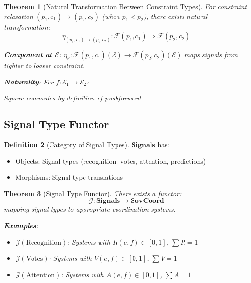 \documentclass[11pt,a4paper]{article}
\newtheorem{theorem}{Theorem}[section]
\theoremstyle{definition}
\newtheorem{definition}[theorem]{Definition}
\theoremstyle{remark}
\newcommand{\E}{\mathcal{E}}
\newcommand{\SovCoord}{\mathbf{SovCoord}}
\begin{document}
\begin{theorem}[Natural Transformation Between Constraint Types]
For constraint relaxation $(p_1, c_1) \to (p_2, c_2)$ (when $p_1 < p_2$), there exists natural transformation:
\[ \eta_{(p_1,c_1) \to (p_2,c_2)}: \mathcal{F}(p_1,c_1) \Rightarrow \mathcal{F}(p_2,c_2) \]

\textbf{Component at $\E$}: $\eta_\E: \mathcal{F}(p_1,c_1)(\E) \to \mathcal{F}(p_2,c_2)(\E)$ maps signals from tighter to looser constraint.

\textbf{Naturality}: For $f: \E_1 \to \E_2$:
\begin{center}
\end{center}

Square commutes by definition of pushforward.
\end{theorem}

\subsection{Signal Type Functor}

\begin{definition}[Category of Signal Types]
$\mathbf{Signals}$ has:
\begin{itemize}
\item Objects: Signal types (recognition, votes, attention, predictions)
\item Morphisms: Signal type translations
\end{itemize}
\end{definition}

\begin{theorem}[Signal Type Functor]
There exists a functor:
\[ \mathcal{G}: \mathbf{Signals} \to \SovCoord \]
mapping signal types to appropriate coordination systems.

\textbf{Examples}:
\begin{itemize}
\item $\mathcal{G}(\text{Recognition})$: Systems with $R(e,f) \in [0,1]$, $\sum R = 1$
\item $\mathcal{G}(\text{Votes})$: Systems with $V(e,f) \in [0,1]$, $\sum V = 1$
\item $\mathcal{G}(\text{Attention})$: Systems with $A(e,f) \in [0,1]$, $\sum A = 1$
\end{itemize}
\end{theorem}
\end{document}
